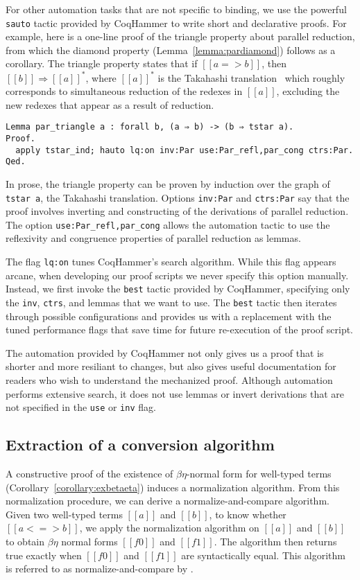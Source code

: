 \documentclass[acmsmall,screen=true,
\ifpublic review=false\else,review=true\fi
  ,anonymous=\ifanonymous true\else false\fi]{acmart}
\begin{document}
For other automation tasks that are not specific to binding, we use
the powerful \texttt{sauto} tactic provided by CoqHammer to write
short and declarative proofs. For example, here is a one-line proof of
the triangle property about parallel reduction, from which the diamond
property (Lemma~\ref{lemma:pardiamond}) follows as a corollary.
The triangle property states
that if $[[a => b]]$, then $[[b]]\Rightarrow [[a]]^*$, where $[[a]]^*$
is the Takahashi translation~\citep{takahashi-parallel-reduction}
which roughly corresponds to simultaneous reduction of the redexes in
$[[a]]$, excluding the new redexes that appear as a result of
reduction.
\begin{verbatim}
Lemma par_triangle a : forall b, (a ⇒ b) -> (b ⇒ tstar a).
Proof.
  apply tstar_ind; hauto lq:on inv:Par use:Par_refl,par_cong ctrs:Par.
Qed.
\end{verbatim}
In prose, the triangle property can be proven by induction over the graph of
\texttt{tstar a}, the Takahashi translation. Options \texttt{inv:Par}
and \texttt{ctrs:Par} say that the proof involves inverting and constructing
of the derivations of parallel reduction. The option
\texttt{use:Par\_refl,par\_cong} allows the automation tactic to use the
reflexivity and congruence properties of parallel reduction as lemmas.

The flag \texttt{lq:on} tunes CoqHammer's search algorithm.  While this flag
appears arcane, when developing our proof scripts we never specify this option
manually. Instead, we first invoke the \texttt{best} tactic provided by
CoqHammer, specifying only the \texttt{inv}, \texttt{ctrs}, and lemmas that we
want to use. The \texttt{best} tactic then iterates through possible
configurations and provides us with a replacement with the tuned performance
flags that save time for future re-execution of the proof script.

The automation provided by CoqHammer not only gives us a proof that is shorter
and more resiliant to changes, but also gives useful documentation for readers
who wish to understand the mechanized proof. Although automation performs
extensive search, it does not use lemmas or invert derivations that are not
specified in the \texttt{use} or \texttt{inv} flag.

\subsection{Extraction of a conversion algorithm}
\label{sec:conversionalgo}
A constructive proof of the existence of $\beta\eta$-normal form
for well-typed terms (Corollary~\ref{corollary:exbetaeta}) induces a
normalization algorithm. From this normalization procedure, we can
derive a normalize-and-compare algorithm. Given two well-typed terms
$[[a]]$ and $[[b]]$, to know whether $[[a <=> b]]$, we apply the
normalization algorithm on $[[a]]$ and $[[b]]$ to obtain $\beta\eta$
normal forms $[[f0]]$ and $[[f1]]$. The algorithm then returns true
exactly when $[[f0]]$ and $[[f1]]$ are syntactically equal. This
algorithm is referred to as normalize-and-compare by
\citet{pierce2004advanced}.
\end{document}
